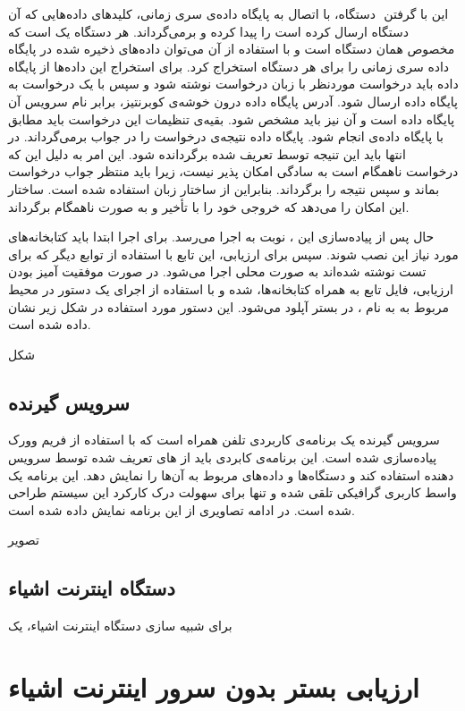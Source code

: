 این  با گرفتن ‌ دستگاه، با اتصال به پایگاه داده‌ی سری زمانی، کلیدهای داده‌هایی که آن دستگاه ارسال کرده است را پیدا کرده و برمی‌گرداند.  هر دستگاه یک  است که مخصوص همان دستگاه است و با استفاده از آن می‌توان داده‌های ذخیره شده در پایگاه داده سری زمانی را برای هر دستگاه استخراج کرد. برای استخراج این داده‌ها از پایگاه داده باید درخواست موردنظر با زبان درخواست  نوشته شود و سپس با یک درخواست  به پایگاه داده ارسال شود. آدرس پایگاه داده درون خوشه‌ی کوبرنتیز، برابر نام سرویس  آن پایگاه داده است و  آن نیز باید مشخص شود. بقیه‌ی تنظیمات این درخواست  باید مطابق با  پایگاه داده‌ی  انجام شود. پایگاه داده نتیجه‌ی درخواست را در جواب برمی‌گرداند. در انتها باید این تنیجه توسط  تعریف شده برگردانده شود. این امر به دلیل این که درخواست  ناهمگام است به سادگی امکان پذیر نیست، زیرا  باید منتظر جواب درخواست  بماند و سپس نتیجه را برگرداند. بنابراین از ساختار  زبان  استفاده شده است. ساختار  این امکان را می‌دهد که  خروجی خود را با تأخیر و به صورت ناهمگام برگرداند.

حال پس از پیاده‌سازی این ، نوبت به اجرا می‌رسد. برای اجرا ابتدا باید کتابخانه‌های مورد نیاز این  نصب شوند. سپس برای ارزیابی، این تابع با استفاده از توابع دیگر که برای تست نوشته شده‌اند به صورت محلی اجرا می‌شود. در صورت موفقیت آمیز بودن ارزیابی، فایل تابع به همراه کتابخانه‌ها،  شده و با استفاده از اجرای یک دستور در محیط  مربوط به  به نام ، در بستر آپلود می‌شود. این دستور مورد استفاده در شکل زیر نشان داده شده است.

شکل

\subsubsection*{}

\subsection{سرویس گیرنده}

سرویس گیرنده یک برنامه‌ی کاربردی تلفن همراه است که با استفاده از فریم وورک  پیاده‌سازی شده است. این برنامه‌ی کابردی باید از  های تعریف شده توسط سرویس دهنده استفاده کند و دستگاه‌ها و داده‌های مربوط به آن‌ها را نمایش دهد. این برنامه یک واسط کاربری گرافیکی تلقی شده و تنها برای سهولت درک کارکرد این سیستم طراحی شده است. در ادامه تصاویری از این برنامه نمایش داده شده است.

تصویر

\subsection{دستگاه اینترنت اشیاء}

برای شبیه سازی دستگاه اینترنت اشیاء، یک 

\section{ارزیابی بستر بدون سرور اینترنت اشیاء}




